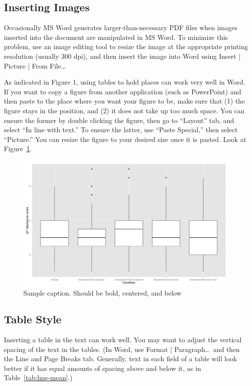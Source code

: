 \documentclass{icis}
\begin{document}
\subsection{Inserting Images}
Occasionally MS Word generates larger-than-necessary PDF files when images
inserted into the document are manipulated in MS Word. To minimize this
problem, use an image editing tool to resize the image at the appropriate
printing resolution (usually 300 dpi), and then insert the image into Word using
Insert | Picture | From File\ldots

As indicated in Figure 1, using tables to hold places can work very well in
Word. If you want to copy a figure from another application (such as PowerPoint)
and then paste to the place where you want your figure to be, make sure that (1)
the figure stays in the position, and (2) it does not take up too much
space. You can ensure the former by double clicking the figure, then go to
``Layout'' tab, and select ``In line with text.'' To ensure the latter, use ``Paste
Special,'' then select ``Picture.'' You can resize the figure to your desired size
once it is pasted. Look at Figure~\ref{fig:test}.

\begin{figure}[h]
  \centering
  \includegraphics[scale = 0.45]{testimage.png}
  \caption{Sample caption. Should be bold, centered, and below} 
  \label{fig:test}
\end{figure}


\subsection{Table Style}
Inserting a table in the text can work well. You may want to adjust the vertical
spacing of the text in the tables. (In Word, use Format | Paragraph\ldots~and
then the Line and Page Breaks tab. Generally, text in each field of a table will
look better if it has equal amounts of spacing above and below it, as in
Table~\ref{tab:lme-mean}.)
\end{document}
